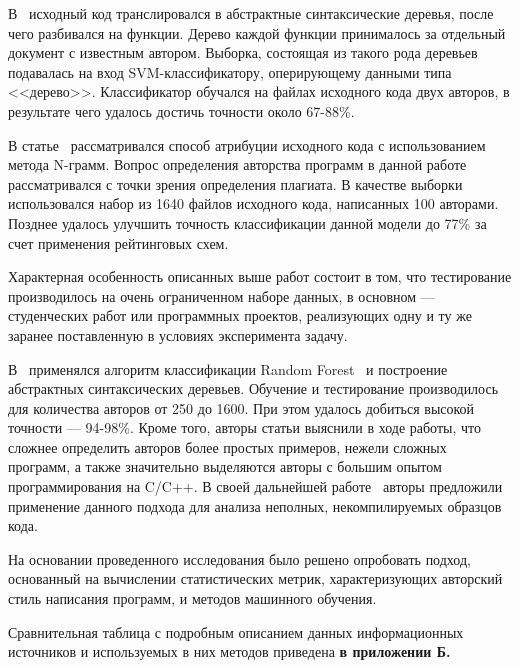 В~\cite{pellin} исходный код транслировался в абстрактные синтаксические деревья, 
после чего разбивался на функции. Дерево каждой функции принималось за отдельный документ с известным автором. 
Выборка, состоящая из такого рода деревьев подавалась на вход SVM-классификатору, 
оперирующему данными типа <<дерево>>. Классификатор обучался на файлах исходного кода двух авторов, в результате чего удалось достичь точности около 67-88\%.

В статье~\cite{burrows} рассматривался способ атрибуции исходного кода с использованием метода N-грамм. 
Вопрос определения авторства программ в данной работе рассматривался с точки зрения определения плагиата. 
В качестве выборки использовался набор из 1640 файлов исходного кода, написанных 100 авторами. Позднее 
удалось улучшить точность классификации данной модели до 77\% за счет применения рейтинговых схем.~\cite{burrows_big}

Характерная особенность описанных выше работ состоит в том, что тестирование производилось на очень 
ограниченном наборе данных, в основном --- студенческих работ или программных проектов, реализующих 
одну и ту же заранее поставленную в условиях эксперимента задачу.

В~\cite{caliskan} применялся алгоритм классификации Random Forest~\cite{random_forest} и построение 
абстрактных синтаксических деревьев. Обучение и тестирование производилось для 
количества авторов от 250 до 1600. При этом удалось добиться высокой точности --- 94-98\%. 
Кроме того, авторы статьи выяснили в ходе работы, что сложнее определить авторов более простых примеров, 
нежели сложных программ, а также значительно выделяются авторы с большим опытом программирования на C/C++. 
В своей дальнейшей работе~\cite{git_blame} авторы предложили применение данного подхода для анализа неполных, 
некомпилируемых образцов кода. 

На основании проведенного исследования было решено опробовать подход, основанный на вычислении 
статистических метрик, характеризующих авторский стиль написания программ, и методов машинного обучения. 

Сравнительная таблица с подробным описанием данных информационных источников и используемых в них методов 
приведена \textbf{в приложении Б.}





